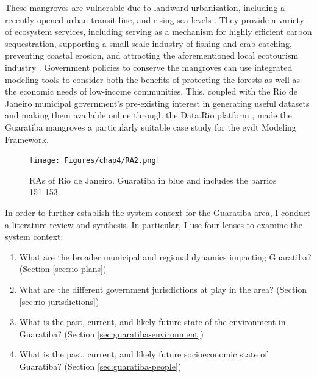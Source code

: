 These mangroves are vulnerable due to landward urbanization, including a recently opened urban transit line, and rising sea levels \cite{goldbergEcoMapDecisionsupportTool2018}. They provide a variety of ecosystem services, including serving as a mechanism for highly efficient carbon sequestration, supporting a small-scale industry of fishing and crab catching, preventing coastal erosion, and attracting the aforementioned local ecotourism industry \cite{schwenkResearchEnvironmentalSocioeconomical2008}. Government policies to conserve the mangroves can use integrated modeling tools to consider both the benefits of protecting the forests as well as the economic needs of low-income communities. This, coupled with the Rio de Janeiro municipal government's pre-existing interest in generating useful datasets and making them available online through the Data.Rio platform \cite{matheusOpenGovernmentData2014}, made the Guaratiba mangroves a particularly suitable case study for the \ac{evdt} Modeling Framework.

\begin{figure}[h]
	\centering
	\texttt{[image: Figures/chap4/RA2.png]}
	\caption{RAs of Rio de Janeiro. Guaratiba in blue and includes the barrios 151-153.}
	\label{fig:ras}
\end{figure}

In order to further establish the system context for the Guaratiba area, I conduct a literature review and synthesis. In particular, I use four lenses to examine the system context:

\begin{enumerate} \setlength{\itemsep}{0pt} \setlength{\parskip}{0pt}
    \item What are the broader municipal and regional dynamics impacting Guaratiba? (Section \ref{sec:rio-plans})
    \item What are the different government jurisdictions at play in the area? (Section \ref{sec:rio-jurisdictions})
    \item What is the past, current, and likely future state of the environment in Guaratiba? (Section \ref{sec:guaratiba-environment})
    \item What is the past, current, and likely future socioeconomic state of Guaratiba? (Section \ref{sec:guaratiba-people})
\end{enumerate}

\subsubsection{}

